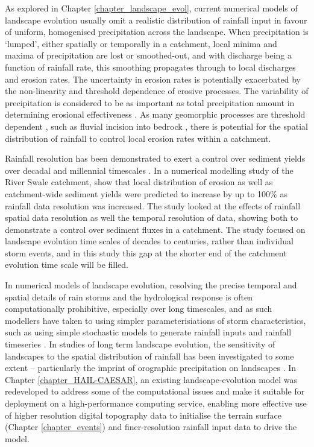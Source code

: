 As explored in Chapter \ref{chapter_landscape_evol}, current numerical models of landscape evolution usually omit a realistic distribution of rainfall input in favour of uniform, homogenised precipitation across the landscape. When precipitation is `lumped', either spatially or temporally in a catchment, local minima and maxima of precipitation are lost or smoothed-out, and with discharge being a function of rainfall rate, this smoothing propagates through to local discharges and erosion rates. The uncertainty in erosion rates is potentially exacerbated by the non-linearity and threshold dependence of erosive processes. The variability of precipitation is considered to be as important as total precipitation amount in determining erosional effectiveness \citep{Tucker2000,Tucker2010}. As many geomorphic processes are threshold dependent \citep{schumm1979geomorphic}, such as fluvial incision into bedrock \citep{sklar2001sediment,snyder2003importance}, there is potential for the spatial distribution of rainfall to control local erosion rates within a catchment. 

Rainfall resolution has been demonstrated to exert a control over sediment yields over decadal and millennial timescales \citep{coulthard2016sensitivity}. In a numerical modelling study of the River Swale catchment, \citet{coulthard2016sensitivity} show that local distribution of erosion as well as catchment-wide sediment yields were predicted to increase by up to 100\% as rainfall data resolution was increased. The study looked at the effects of rainfall spatial data resolution as well the temporal resolution of data, showing both to demonstrate a control over sediment fluxes in a catchment. The study focused on landscape evolution time scales of decades to centuries, rather than individual storm events, and in this study this gap at the shorter end of the catchment evolution time scale will be filled. 

In numerical models of landscape evolution, resolving the precise temporal and spatial details of rain storms and the hydrological response is often computationally prohibitive, especially over long timescales, and as such modellers have taken to using simpler parameterisiations of storm characteristics, such as using simple stochastic models to generate rainfall inputs and rainfall timeseries \citep{Eagleson1978,Tucker2001}. In studies of long term landscape evolution, the sensitivity of landscapes to the spatial distribution of rainfall has been investigated to some extent -- particularly the imprint of orographic precipitation on landscapes \citep[e.g][]{Roe2002,Anders2008,Han2014}. In Chapter \ref{chapter_HAIL-CAESAR}, an existing landscape-evolution model was redeveloped to address some of the computational issues and make it suitable for deployment on a high-performance computing service, enabling more effective use of higher resolution digital topography data to initialise the terrain surface (Chapter \ref{chapter_events}) and finer-resolution rainfall input data to drive the model. 

